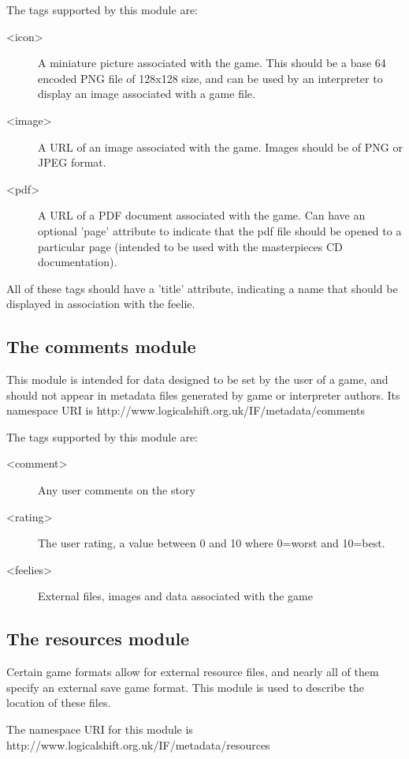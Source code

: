 \documentclass[a4paper,11pt]{article}
\begin{document}
The tags supported by this module are:

\begin{description}
\item[<icon>] A miniature picture associated with the game. This should be a base 64 encoded 
PNG file of 128x128 size, and can be used by an interpreter to display an image associated with
a game file.
\item[<image>] A URL of an image associated with the game. Images should be of PNG or
JPEG format.
\item[<pdf>] A URL of a PDF document associated with the game. Can have an optional 'page' attribute to indicate that the
pdf file should be opened to a particular page (intended to be used with the masterpieces
CD documentation).
\end{description}

All of these tags should have a 'title' attribute, indicating a name that should be displayed
in association with the feelie.

\subsection{The comments module}

This module is intended for data designed to be set by the user of a game, and should not appear in metadata files generated by
game or interpreter authors. Its namespace URI is http://www.logicalshift.org.uk/IF/metadata/comments

The tags supported by this module are:

\begin{description}
\item[<comment>] Any user comments on the story
\item[<rating>] The user rating, a value between 0 and 10 where 0=worst and 10=best.
\item[<feelies>] External files, images and data associated with the game
\end{description}

\subsection{The resources module}

Certain game formats allow for external resource files, and nearly all of them specify
an external save game format. This module is used to describe the location of these files.

The namespace URI for this module is http://www.logicalshift.org.uk/IF/metadata/resources
\end{document}
